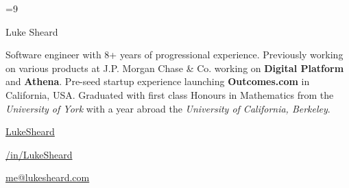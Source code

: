\documentclass{article}
\newcommand{\social}[3]{
   	\textbf{#1}
   	\hspace{2pt}
	\href{#2}{#3}
	\hspace{15pt}
}
\begin{document}
\color{body}

=9\relax     %

\raggedright

\fontsize{10pt}{13pt}\selectfont


{\Huge Luke Sheard}

\vspace{10pt}

Software engineer with 8+ years of progressional experience. Previously working on various products at J.P. Morgan Chase \& Co. working on \textbf{Digital Platform} and \textbf{Athena}. Pre-seed startup experience launching \textbf{Outcomes.com} in California, USA. Graduated with first class Honours in Mathematics from the \textit{University of York} with a year abroad the \textit{University of California, Berkeley}.



\vspace{5pt}

\social{\faGithub}{https://www.github.com/LukeSheard}{LukeSheard}
\social{\faLinkedin}{https://www.linkedin.com/in/lukesheard}{/in/LukeSheard}
\social{\faEnvelope}{mailto:me@lukesheard.com}{me@lukesheard.com}

\vspace{15pt}
\end{document}

